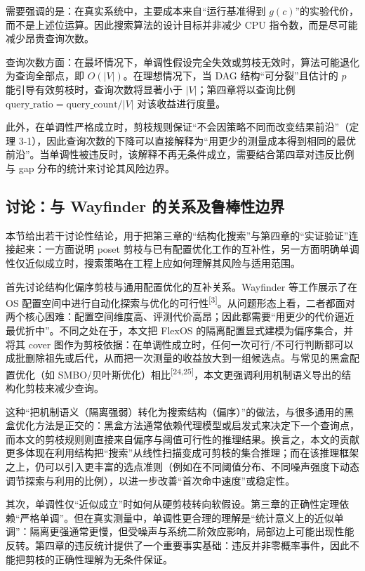 \documentclass[UTF8,a4paper,12pt]{ctexart}
\numberwithin{equation}{section}
\begin{document}
需要强调的是：在真实系统中，主要成本来自``运行基准得到
\(g(c)\)''的实验代价，而不是上述位运算。因此搜索算法的设计目标并非减少
CPU 指令数，而是尽可能减少昂贵查询次数。

查询次数方面：在最坏情况下，单调性假设完全失效或剪枝无效时，算法可能退化为查询全部点，即
\(O(|V|)\)。在理想情况下，当 DAG 结构``可分裂''且估计的 \(p\)
能引导有效剪枝时，查询次数将显著小于 \(|V|\)；第四章将以查询比例
\(\text{query\_ratio}=\text{query\_count}/|V|\) 对该收益进行度量。

此外，在单调性严格成立时，剪枝规则保证``不会因策略不同而改变结果前沿''（定理
3-1），因此查询次数的下降可以直接解释为``用更少的测量成本得到相同的最优前沿''。当单调性被违反时，该解释不再无条件成立，需要结合第四章对违反比例与
gap 分布的统计来讨论其风险边界。

\subsection{讨论：与 Wayfinder
的关系及鲁棒性边界}

本节给出若干讨论性结论，用于把第三章的``结构化搜索''与第四章的``实证验证''连接起来：一方面说明
poset
剪枝与已有配置优化工作的互补性，另一方面明确单调性仅近似成立时，搜索策略在工程上应如何理解其风险与适用范围。

首先讨论结构化偏序剪枝与通用配置优化的互补关系。Wayfinder 等工作展示了在 OS
配置空间中进行自动化探索与优化的可行性\textsuperscript{[3]}。从问题形态上看，二者都面对两个核心困难：配置空间维度高、评测代价高昂；因此都需要``用更少的代价逼近最优折中''。不同之处在于，本文把
FlexOS 的隔离配置显式建模为偏序集合，并将其 cover
图作为剪枝依据：在单调性成立时，任何一次可行/不可行判断都可以成批删除祖先或后代，从而把一次测量的收益放大到一组候选点。与常见的黑盒配置优化（如
SMBO/贝叶斯优化）相比\textsuperscript{[24,25]}，本文更强调利用机制语义导出的结构化剪枝来减少查询。

这种``把机制语义（隔离强弱）转化为搜索结构（偏序）''的做法，与很多通用的黑盒优化方法是正交的：黑盒方法通常依赖代理模型或启发式来决定下一个查询点，而本文的剪枝规则则直接来自偏序与阈值可行性的推理结果。换言之，本文的贡献更多体现在利用结构把``搜索''从线性扫描变成可剪枝的集合推理；而在该推理框架之上，仍可以引入更丰富的选点准则（例如在不同阈值分布、不同噪声强度下动态调节探索与利用的比例），以进一步改善``首次命中速度''或稳定性。

其次，单调性仅``近似成立''时如何从硬剪枝转向软假设。第三章的正确性定理依赖``严格单调''。但在真实测量中，单调性更合理的理解是``统计意义上的近似单调''：隔离更强通常更慢，但受噪声与系统二阶效应影响，局部边上可能出现性能反转。第四章的违反统计提供了一个重要事实基础：违反并非零概率事件，因此不能把剪枝的正确性理解为无条件保证。
\end{document}
